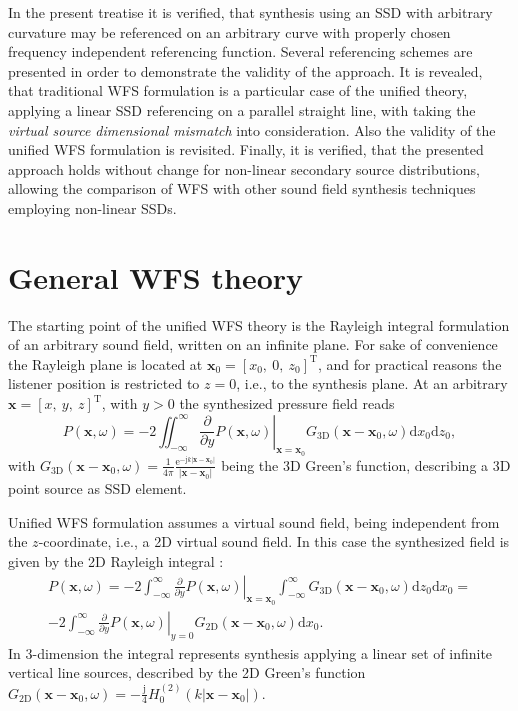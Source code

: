 \documentclass[12pt,a4paper]{article}
\newcommand{\td}{\mathrm{d}}
\newcommand{\te}{\mathrm{e}}
\newcommand{\ti}{\mathrm{j}}
\newcommand{\vx}{\mathbf{x}}
\newcommand{\vxo}{\mathbf{x}_0}
\begin{document}
In the present treatise it is verified, that synthesis using an SSD with arbitrary curvature may be referenced on an arbitrary curve with properly chosen frequency independent referencing function. Several referencing schemes are presented in order to demonstrate the validity of the approach. It is revealed, that traditional WFS formulation is a particular case of the unified theory, applying a linear SSD referencing on a parallel straight line, with taking the \emph{virtual source dimensional mismatch} into consideration.
Also the validity of the unified WFS formulation is revisited.
Finally, it is verified, that the presented approach holds without change for non-linear secondary source distributions, allowing the comparison of WFS with other sound field synthesis techniques employing non-linear SSDs.

\section{General WFS theory}
The starting point of the unified WFS theory is the Rayleigh integral formulation of an arbitrary sound field, written on an infinite plane. For sake of convenience the Rayleigh plane is located at $\vxo = [x_0,\ 0,\ z_0]^{\mathrm{T}}$, and for practical reasons the listener position is restricted to $z=0$, i.e., to the synthesis plane. At an arbitrary $\vx = [x,\ y,\ z]^{\mathrm{T}}$, with $y>0$ the synthesized pressure field reads
\begin{equation}
P(\vx,\omega) = -2 \iint_{-\infty}^{\infty} \left. \frac{\partial}{\partial y} P(\vx,\omega) \right|_{\vx = \vxo} G_{3\mathrm{D}}(\vx - \vxo,\omega) \td x_0 \td z_0,
\label{Eq:Theory:3D_Rayleigh}
\end{equation}
with $G_{3\mathrm{D}}(\vx - \vxo,\omega) = \frac{1}{4\pi} \frac{\te^{-\ti k |\vx-\vxo| }}{|\vx-\vxo|}$ being the 3D Green's function, describing a 3D point source as SSD element.

% 
Unified WFS formulation assumes a virtual sound field, being independent from the $z$-coordinate, i.e., a 2D virtual sound field. In this case the synthesized field is given by the 2D Rayleigh integral \cite{Spors2008:WFSrevisited}:
\begin{multline}
P(\vx,\omega) = -2 \int_{-\infty}^{\infty} \left. \frac{\partial}{\partial y} P(\vx,\omega) \right|_{\vx=\vxo} 
\int_{-\infty}^{\infty} G_{3\mathrm{D}}(\vx - \vxo,\omega) \td z_0 \td x_0 = \\
-2 \int_{-\infty}^{\infty} \left. \frac{\partial}{\partial y} P(\vx,\omega) \right|_{y = 0} G_{2\mathrm{D}}(\vx - \vxo,\omega) \td x_0.
\label{Eq:2D_Rayleigh}
\end{multline}
In 3-dimension the integral represents synthesis applying a linear set of infinite vertical line sources, described by the 2D Green's function $G_{2\mathrm{D}}(\vx - \vxo,\omega) = -\frac{\ti}{4} H_0^{(2)}\left( k |\vx-\vxo| \right)$.
\end{document}
